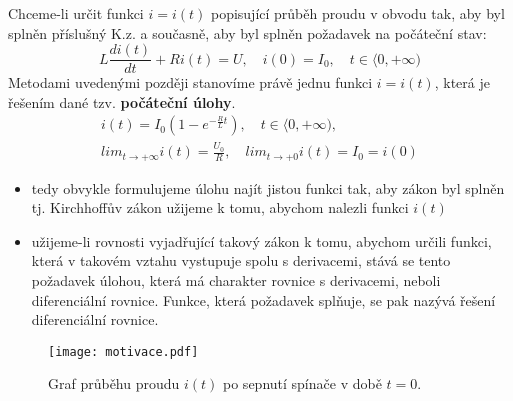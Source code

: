 {    Chceme-li určit funkci $i=i(t)$ popisující průběh proudu v obvodu tak, aby byl splněn příslušný
    K.z. a současně, aby byl splněn požadavek na počáteční stav:
    \begin{equation}
        L\frac{di(t)}{dt}+Ri(t)=U,\quad i(0)=I_0,\quad t\in\langle 0,+\infty)
    \end{equation}
    Metodami uvedenými později stanovíme právě jednu funkci $i=i(t)$, která je řešením dané tzv.
    \textbf{počáteční úlohy}.
    \begin{equation}
      \begin{array}{c}
         i(t)=I_0\left(1-e^{-\frac{R}{L}t}\right),\quad t\in\langle 0,+\infty), \\
         lim_{t\rightarrow +\infty}i(t)=\frac{U_0}{R},\quad lim_{t\rightarrow +0}i(t)=I_0=i(0)
      \end{array}
    \end{equation}
    \begin{itemize}
      \item tedy obvykle formulujeme úlohu najít jistou funkci tak, aby zákon byl splněn tj.
            Kirchhoffův zákon užijeme k tomu, abychom nalezli funkci $i(t)$
      \item užijeme-li rovnosti vyjadřující takový zákon k tomu, abychom určili funkci, která v
            takovém vztahu vystupuje spolu s derivacemi, stává se tento požadavek úlohou, která má
            charakter rovnice s derivacemi, neboli diferenciální rovnice. Funkce, která požadavek
            splňuje, se pak nazývá řešení diferenciální rovnice.
    \end{itemize}
    
    \begin{figure}
      \centering
      \texttt{[image: motivace.pdf]}
      \caption{Graf průběhu proudu $i(t)$ po sepnutí spínače v době $t=0$.}
      \label{figure:odr_motivace}
    \end{figure}

} %
